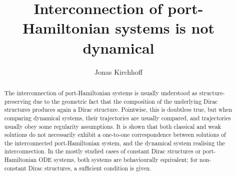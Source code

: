 \documentclass[preprint,12pt]{elsarticle}
\theoremstyle{definition}
\begin{document}

\begin{frontmatter}



\title{Interconnection of port-Hamiltonian systems is not dynamical}


\author[1]{Jonas Kirchhoff} %


\begin{abstract}
The interconnection of port-Hamiltonian systems is usually understood as structure-preserving due to the geometric fact that the composition of the underlying Dirac structures produces again a Dirac structure. Pointwise, this is doubtless true, but when comparing dynamical systems, their trajectories are usually compared, and trajectories usually obey some regularity assumptions. It is shown that both classical and weak solutions do not necessarily exhibit a one-to-one correspondence between solutions of the interconnected port-Hamiltonian system, and the dynamical system realising the interconnection. In the mostly studied cases of constant Dirac structures or port-Hamiltonian ODE systems, both systems are behaviourally equivalent; for non-constant Dirac structures, a sufficient condition is given.
\end{abstract}


\end{frontmatter}
\end{document}
